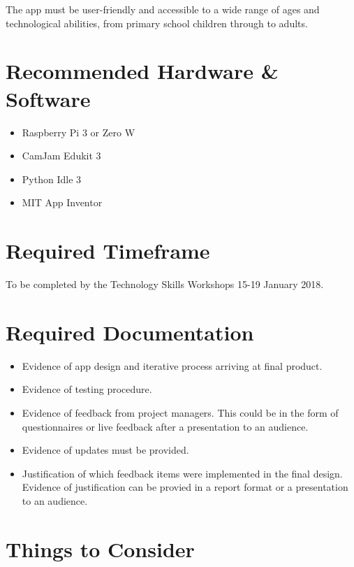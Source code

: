 \documentclass[10pt]{article}
\begin{document}
	The app must be user-friendly and accessible to a wide range of ages and technological abilities, from primary school children through to adults. 
	
	\section{Recommended Hardware \& Software}
	
	\begin{itemize}
		\item Raspberry Pi 3 or Zero W
		\item CamJam Edukit 3
		\item Python Idle 3
		\item MIT App Inventor
	\end{itemize}
	
	\section{Required Timeframe}
	
	To be completed by the Technology Skills Workshops 15-19 January 2018.
	
	\section{Required Documentation}
	
	\begin{itemize}
		\item Evidence of app design and iterative process arriving at final product. 
		\item Evidence of testing procedure. 
		\item Evidence of feedback from project managers. This could be in the form of questionnaires or live feedback after a presentation to an audience.
		\item Evidence of updates must be provided. 
		\item Justification of which feedback items were implemented in the final design. Evidence of justification can be provied in a report format or a presentation to an audience. 
	\end{itemize}

	\section{Things to Consider}
	
\end{document}
